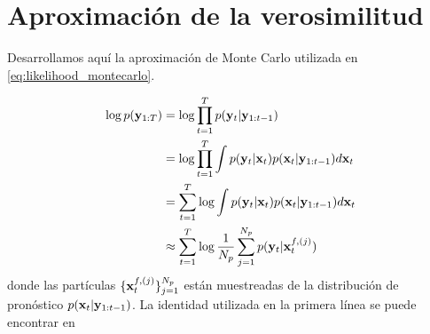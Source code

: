 \section{Aproximación de la verosimilitud}\label{appendix:likelihood_montecarlo}

Desarrollamos aquí la aproximación de Monte Carlo utilizada en \ref{eq:likelihood_montecarlo}.

\begin{align*}
    \log p(\mathbf{y}_{1:T}) &= \log \prod_{t=1}^{T} p(\mathbf{y}_t | \mathbf{y}_{1:t-1}) \\
    &= \log \prod_{t=1}^{T} \int p(\mathbf{y}_t | \mathbf{x}_t) p(\mathbf{x}_t | \mathbf{y}_{1:t-1}) d\mathbf{x}_t \\
    &= \sum_{t=1}^{T} \log \int p(\mathbf{y}_t | \mathbf{x}_t) p(\mathbf{x}_t | \mathbf{y}_{1:t-1}) d\mathbf{x}_t \\
    &\approx \sum_{t=1}^{T} \log \frac{1}{N_p} \sum_{j=1}^{N_p} p(\mathbf{y}_t | \mathbf{x}_t^{f, (j)})
\end{align*}
donde las partículas $\{\mathbf{x}_t^{f, (j)}\}_{j=1}^{N_p}$ están muestreadas de la distribución de pronóstico $p(\mathbf{x}_t | \mathbf{y}_{1:t-1})$. La identidad utilizada en la primera línea se puede encontrar en \cite{Carrassi2017}
